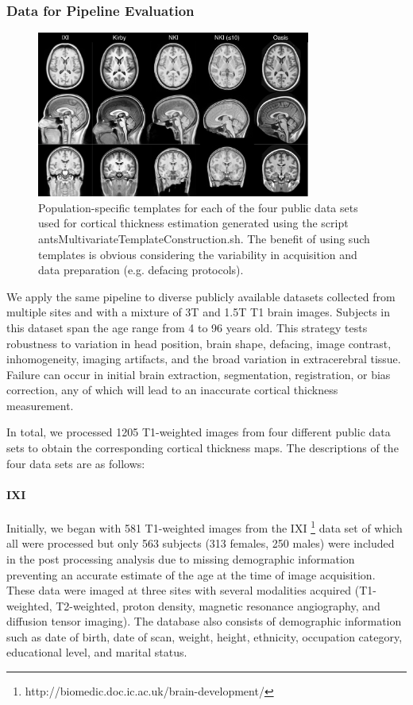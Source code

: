 \subsubsection{Data for Pipeline Evaluation}

\begin{figure}
  \centering
  \includegraphics[width=90mm]{Figures/templates.pdf}
  \caption{Population-specific templates for each of the four public data sets used 
  for cortical thickness 
  estimation generated using the script antsMultivariateTemplateConstruction.sh. 
  The benefit of using such templates is obvious considering the variability in
  acquisition and data preparation (e.g. defacing protocols).
  }
  \label{fig:template}
\end{figure}

We apply the same pipeline to diverse publicly available datasets collected
from multiple sites and with a mixture of 3T and
1.5T T1 brain images.  Subjects in this dataset
span the age range from 4 to 96 years old.  This strategy tests robustness to
variation in head position, brain shape, defacing, image contrast, inhomogeneity, imaging
artifacts, and the broad variation in extracerebral tissue.  Failure
can occur in initial brain extraction, segmentation, registration, or
bias correction, any of which will lead to an inaccurate cortical
thickness measurement.                           

In total, we processed 1205 T1-weighted images from four different
public data sets to obtain the corresponding cortical thickness maps.                           
The descriptions of the four data sets are as follows: 
                                          
\paragraph{IXI}
Initially, we began with 581 T1-weighted images from the IXI%
\footnote{
http://biomedic.doc.ic.ac.uk/brain-development/
}
 data set
of which all were processed but only 563 subjects 
(313 females, 250 males) were included in the post processing analysis due to 
missing demographic information preventing an accurate estimate of 
the age at the time of image acquisition.  These data were
imaged at three sites 
with several modalities acquired (T1-weighted, T2-weighted, proton density, magnetic 
resonance angiography, and diffusion tensor imaging).  The 
database also consists of  demographic information such as date of birth, date
of scan, weight,
height, ethnicity, occupation category, educational level, and marital status.


